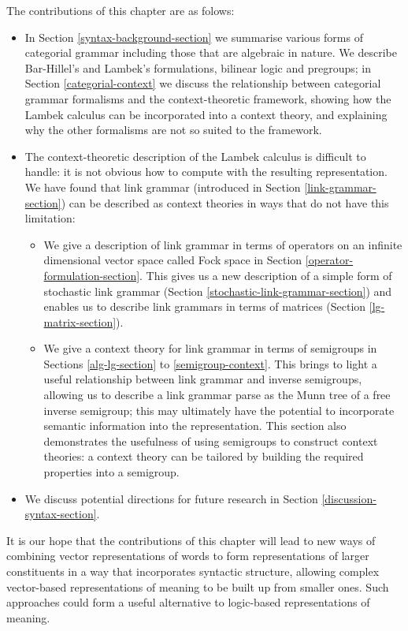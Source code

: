 The contributions of this chapter are as folows:
\begin{itemize}
\item In Section \ref{syntax-background-section} we summarise various forms of categorial grammar including those that are algebraic in nature. We describe Bar-Hillel's and Lambek's formulations, bilinear logic and pregroups; in Section \ref{categorial-context} we discuss the relationship between categorial grammar formalisms and the context-theoretic framework, showing how the Lambek calculus can be incorporated into a context theory, and explaining why the other formalisms are not so suited to the framework.
\item The context-theoretic description of the Lambek calculus is difficult to handle: it is not obvious how to compute with the resulting representation. We have found that link grammar (introduced in Section \ref{link-grammar-section}) can be described as context theories in ways that do not have this limitation:
\begin{itemize}
\item We give a description of link grammar in terms of operators on an infinite dimensional vector space called Fock space in Section \ref{operator-formulation-section}. This gives us a new description of a simple form of stochastic link grammar (Section \ref{stochastic-link-grammar-section}) and enables us to describe link grammars in terms of matrices (Section \ref{lg-matrix-section}).
\item We give a context theory for link grammar in terms of semigroups in Sections \ref{alg-lg-section} to \ref{semigroup-context}. This brings to light a useful relationship between link grammar and inverse semigroups, allowing us to describe a link grammar parse as the Munn tree of a free inverse semigroup; this may ultimately have the potential to incorporate semantic information into the representation. This section also demonstrates the usefulness of using semigroups to construct context theories: a context theory can be tailored by building the required properties into a semigroup.
\end{itemize}
\item We discuss potential directions for future research in Section \ref{discussion-syntax-section}.
\end{itemize}
It is our hope that the contributions of this chapter will lead to new ways of combining vector representations of words to form representations of larger constituents in a way that incorporates syntactic structure, allowing complex vector-based representations of meaning to be built up from smaller ones. Such approaches could form a useful alternative to logic-based representations of meaning.

